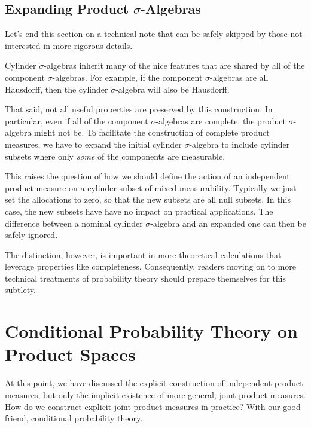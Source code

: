 \documentclass[
  letterpaper,
  DIV=11,
  numbers=noendperiod]{scrartcl}
\begin{document}
\subsection{\texorpdfstring{Expanding Product
{\(\sigma\)}-Algebras}{Expanding Product \textbackslash sigma-Algebras}}\label{expanding-product-sigma-algebras}

Let's end this section on a technical note that can be safely skipped by
those not interested in more rigorous details.

Cylinder \(\sigma\)-algebras inherit many of the nice features that are
shared by all of the component \(\sigma\)-algebras. For example, if the
component \(\sigma\)-algebras are all Hausdorff, then the cylinder
\(\sigma\)-algebra will also be Hausdorff.

That said, not all useful properties are preserved by this construction.
In particular, even if all of the component \(\sigma\)-algebras are
complete, the product \(\sigma\)-algebra might not be. To facilitate the
construction of complete product measures, we have to expand the initial
cylinder \(\sigma\)-algebra to include cylinder subsets where only
\emph{some} of the components are measurable.

This raises the question of how we should define the action of an
independent product measure on a cylinder subset of mixed measurability.
Typically we just set the allocations to zero, so that the new subsets
are all null subsets. In this case, the new subsets have have no impact
on practical applications. The difference between a nominal cylinder
\(\sigma\)-algebra and an expanded one can then be safely ignored.

The distinction, however, is important in more theoretical calculations
that leverage properties like completeness. Consequently, readers moving
on to more technical treatments of probability theory should prepare
themselves for this subtlety.

\section{Conditional Probability Theory on Product
Spaces}\label{conditional-probability-theory-on-product-spaces}

At this point, we have discussed the explicit construction of
independent product measures, but only the implicit existence of more
general, joint product measures. How do we construct explicit joint
product measures in practice? With our good friend, conditional
probability theory.
\end{document}
